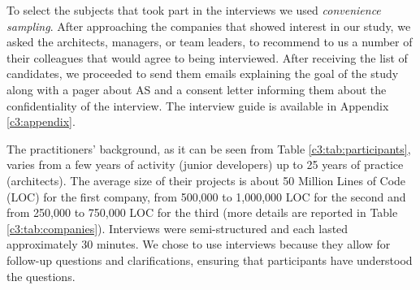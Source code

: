 To select the subjects that took part in the interviews we used \emph{convenience sampling}. After approaching the companies that showed interest in our study, we asked the architects, managers, or team leaders, to recommend to us a number of their colleagues that would agree to being interviewed. After receiving the list of candidates, we proceeded to send them emails explaining the goal of the study along with a pager about AS and a consent letter informing them about the confidentiality of the interview.
The interview guide is available in Appendix \ref{c3:appendix}.

The practitioners' background, as it can be seen from Table \ref{c3:tab:participants}, varies from a few years of activity (junior developers) up to 25 years of practice (architects).
The average size of their projects is about 50 Million Lines of Code (LOC) for the first company, from 500,000 to 1,000,000 LOC for the second and from 250,000 to 750,000 LOC for the third (more details are reported in Table \ref{c3:tab:companies}). 
Interviews were semi-structured and each lasted approximately 30 minutes. We chose to use interviews because they allow for follow-up questions and clarifications, ensuring that participants have understood the questions. 

